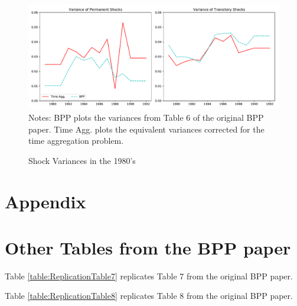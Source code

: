 \documentclass[titlepage]{\econtex}\newcommand{\texname}{BPP_TimeAgg}
\begin{document}


\begin{figure}
	\caption{Shock Variances in the 1980's}
	\label{figure:shockVariance}
	\includegraphics[width=1\textwidth]{../Code/Figures/ShockVariances1980s.pdf}
	\footnotesize Notes: BPP plots the variances from Table 6 of the original BPP paper. Time Agg. plots the equivalent variances corrected for the time aggregation problem.
\end{figure}

\processdelayedfloats

\small

\normalsize

\pagebreak
\appendix

\section*{Appendix}





\section{Other Tables from the BPP paper} \label{table_appendix}
Table \ref{table:ReplicationTable7} replicates Table 7 from the original BPP paper.

 

Table \ref{table:ReplicationTable8} replicates Table 8 from the original BPP paper.
\end{document}
